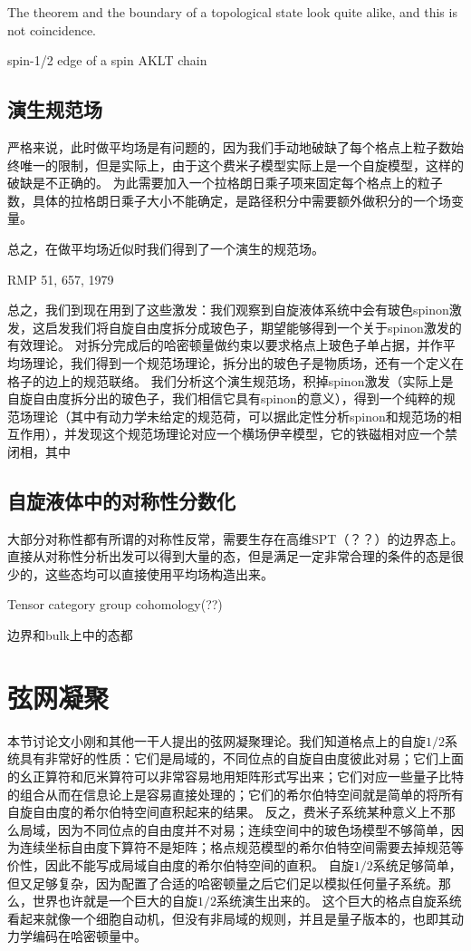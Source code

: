 \documentclass[hyperref, UTF8, a4paper]{ctexart}
\begin{document}
The theorem and the boundary of a topological state look quite alike, and this is not coincidence.

spin-1/2 edge of a spin AKLT chain

\subsection{演生规范场}

严格来说，此时做平均场是有问题的，因为我们手动地破缺了每个格点上粒子数始终唯一的限制，但是实际上，由于这个费米子模型实际上是一个自旋模型，这样的破缺是不正确的。
为此需要加入一个拉格朗日乘子项来固定每个格点上的粒子数，具体的拉格朗日乘子大小不能确定，是路径积分中需要额外做积分的一个场变量。

总之，在做平均场近似时我们得到了一个演生的规范场。

RMP 51, 657, 1979

总之，我们到现在用到了这些激发：我们观察到自旋液体系统中会有玻色spinon激发，这启发我们将自旋自由度拆分成玻色子，期望能够得到一个关于spinon激发的有效理论。
对拆分完成后的哈密顿量做约束以要求格点上玻色子单占据，并作平均场理论，我们得到一个规范场理论，拆分出的玻色子是物质场，还有一个定义在格子的边上的规范联络。
我们分析这个演生规范场，积掉spinon激发（实际上是自旋自由度拆分出的玻色子，我们相信它具有spinon的意义），得到一个纯粹的规范场理论（其中有动力学未给定的规范荷，可以据此定性分析spinon和规范场的相互作用），并发现这个规范场理论对应一个横场伊辛模型，它的铁磁相对应一个禁闭相，其中

\subsection{自旋液体中的对称性分数化}

大部分对称性都有所谓的对称性反常，需要生存在高维SPT（？？）的边界态上。
直接从对称性分析出发可以得到大量的态，但是满足一定非常合理的条件的态是很少的，这些态均可以直接使用平均场构造出来。

Tensor category group cohomology(??)

边界和bulk上中的态都

\section{弦网凝聚}

本节讨论文小刚和其他一干人提出的弦网凝聚理论。我们知道格点上的自旋$1/2$系统具有非常好的性质：它们是局域的，不同位点的自旋自由度彼此对易；它们上面的幺正算符和厄米算符可以非常容易地用矩阵形式写出来；它们对应一些量子比特的组合从而在信息论上是容易直接处理的；它们的希尔伯特空间就是简单的将所有自旋自由度的希尔伯特空间直积起来的结果。
反之，费米子系统某种意义上不那么局域，因为不同位点的自由度并不对易；连续空间中的玻色场模型不够简单，因为连续坐标自由度下算符不是矩阵；格点规范模型的希尔伯特空间需要去掉规范等价性，因此不能写成局域自由度的希尔伯特空间的直积。
自旋$1/2$系统足够简单，但又足够复杂，因为配置了合适的哈密顿量之后它们足以模拟任何量子系统。那么，世界也许就是一个巨大的自旋$1/2$系统演生出来的。
这个巨大的格点自旋系统看起来就像一个细胞自动机，但没有非局域的规则，并且是量子版本的，也即其动力学编码在哈密顿量中。
\end{document}
